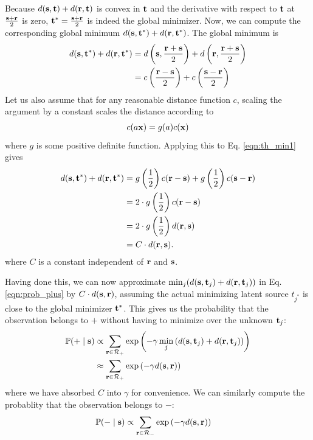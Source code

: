 Because $d(\mathbf s, \mathbf t) + d(\mathbf r, \mathbf t)$ is convex in $\mathbf t$ and the
derivative with respect to $\mathbf t$ at $\frac{\mathbf s + \mathbf r}{2}$ is zero, $\mathbf
t^* = \frac{\mathbf s + \mathbf r}{2}$ is indeed the global minimizer. Now, we can
compute the corresponding global minimum $d(\mathbf s,\mathbf t^*) + d(\mathbf r,\mathbf
t^*)$. The global minimum is
\begin{align}
d(\mathbf s,\mathbf t^*) + d(\mathbf r,\mathbf t^*) &= d\left(\mathbf s,\frac{\mathbf r + \mathbf s}{2}\right) + d\left(\mathbf r,\frac{\mathbf r + \mathbf s}{2}\right)\notag\\
&= c\left(\frac{\mathbf r - \mathbf s}{2}\right) + c\left(\frac{\mathbf s - \mathbf r}{2}\right) \label{eqn:th_min1}
\end{align}
Let us also assume that for any reasonable distance function $c$, scaling the
argument by a constant scales the distance according to
\begin{gather}
c(a\mathbf x) = g(a)c(\mathbf x)
\end{gather}
where $g$ is some positive definite function. Applying this to Eq. \ref{eqn:th_min1} gives
\begin{align}
d(\mathbf s,\mathbf t^*) + d(\mathbf r,\mathbf t^*) &= g\left(\frac{1}{2}\right) c(\mathbf r - \mathbf s) +  g\left(\frac{1}{2}\right) c(\mathbf s - \mathbf r)\notag\\
&= 2 \cdot g\left(\frac{1}{2}\right) c(\mathbf r - \mathbf s)\notag\\
&= 2 \cdot g\left(\frac{1}{2}\right) d(\mathbf r, \mathbf s)\notag\\
&= C \cdot d(\mathbf r, \mathbf s).
\end{align}
where $C$ is a constant independent of $\mathbf r$ and $\mathbf s$.

Having done this, we can now approximate $\min_j (d(\mathbf s,\mathbf t_j) + d(\mathbf r,\mathbf
t_j))$ in Eq. \ref{eqn:prob_plus} by $C \cdot d(\mathbf s,\mathbf r)$, assuming the
actual minimizing latent source $t_{j^*}$ is close to the global minimizer
$\mathbf t^*$. This gives us the probability that the observation belongs to $+$ without
having to minimize over the unknown $\mathbf t_j$:
\begin{align}
\mathbb{P}(+ \;|\;\mathbf s) &\propto \sum_{\mathbf r \in \mathcal{R}_+}
\exp{\left(-\gamma \min_{j} \left( d(\mathbf s,\mathbf t_j) + d(\mathbf r,\mathbf t_j) \right) \right)}\notag\\
&\approx \sum_{\mathbf r \in \mathcal{R}_+} \exp
\left(-\gamma d(\mathbf s,\mathbf r)\right) \label{eqn:prob_plus_approx}
\end{align}
where we have absorbed $C$ into $\gamma$ for convenience. We can similarly compute the probablity that the observation belongs to $-$:
\begin{align}
\mathbb{P}(- \;|\; \mathbf s ) &\propto \sum_{\mathbf r \in
  \mathcal{R}_-} \exp \left(-\gamma d(\mathbf s,\mathbf
  r)\right) \label{eqn:prob_minus_approx}
\end{align}

